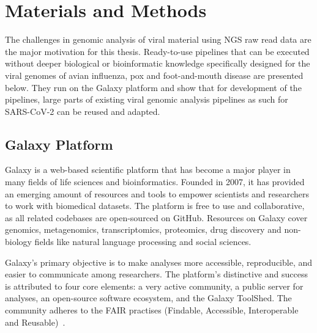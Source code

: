 \chapter{Materials and Methods}\label{chap:methods}
The challenges in genomic analysis of viral material using NGS raw read data are the major motivation for this thesis. Ready-to-use pipelines that can be executed without deeper biological or bioinformatic knowledge specifically designed for the viral genomes of avian influenza, pox and foot-and-mouth disease are presented below. They run on the Galaxy platform and show that for development of the pipelines, large parts of existing viral genomic analysis pipelines as such for SARS-CoV-2 can be reused and adapted.

\section{Galaxy Platform}\label{sec:galaxy}
Galaxy is a web-based scientific platform that has become a major player in many fields of life sciences and bioinformatics. Founded in 2007, it has provided an emerging amount of resources and tools to empower scientists and researchers to work with biomedical datasets. The platform is free to use and collaborative, as all related codebases are open-sourced on GitHub. Resources on Galaxy cover genomics, metagenomics, transcriptomics, proteomics, drug discovery and non-biology fields like natural language processing and social sciences.

Galaxy's primary objective is to make analyses more accessible, reproducible, and easier to communicate among researchers. The platform's distinctive and success is attributed to four core elements: a very active community, a public server for analyses, an open-source software ecosystem, and the Galaxy ToolShed. The community adheres to the FAIR practises (Findable, Accessible, Interoperable and Reusable)~\cite{10.1093/nar/gkac247}.

